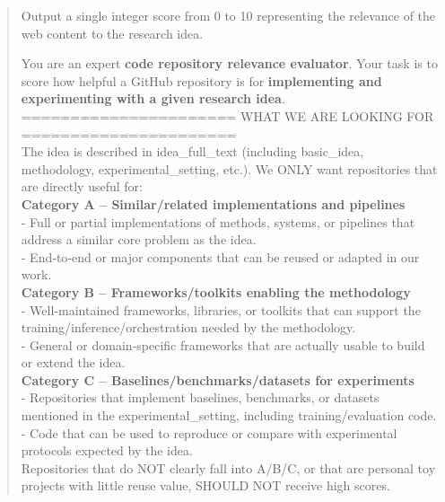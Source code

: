 \begin{quote}
\begin{tcolorbox}[breakable,colback=search!20!white, colframe=search!60!black, title=\textbf{Prompt for Search Agent (Search Results Scoring - Web)}]
        Output a single integer score from 0 to 10 representing the relevance of the web content to the research idea.
    \end{tcolorbox}

    \begin{tcolorbox}[breakable,colback=search!20!white, colframe=search!60!black, title=\textbf{Prompt for Search Agent (Search Results Scoring - Code)}]
    \label{app:prompt_search_score_code}
        You are an expert \textbf{code repository relevance evaluator}. Your task is to score how helpful a GitHub repository is for \textbf{implementing and experimenting with a given research idea}.\\

        ====================== WHAT WE ARE LOOKING FOR ======================\\
        The idea is described in idea\_full\_text (including basic\_idea, methodology, experimental\_setting, etc.). We ONLY want repositories that are directly useful for:\\

        \textbf{Category A – Similar/related implementations and pipelines}\\
        - Full or partial implementations of methods, systems, or pipelines that address a similar core problem as the idea.\\
        - End‑to‑end or major components that can be reused or adapted in our work.\\

        \textbf{Category B – Frameworks/toolkits enabling the methodology}\\
        - Well‑maintained frameworks, libraries, or toolkits that can support the training/inference/orchestration needed by the methodology.\\
        - General or domain‑specific frameworks that are actually usable to build or extend the idea.\\

        \textbf{Category C – Baselines/benchmarks/datasets for experiments}\\
        - Repositories that implement baselines, benchmarks, or datasets mentioned in the experimental\_setting, including training/evaluation code.\\
        - Code that can be used to reproduce or compare with experimental protocols expected by the idea.\\

        Repositories that do NOT clearly fall into A/B/C, or that are personal toy projects with little reuse value, SHOULD NOT receive high scores.\\


\end{tcolorbox}
\end{quote}
